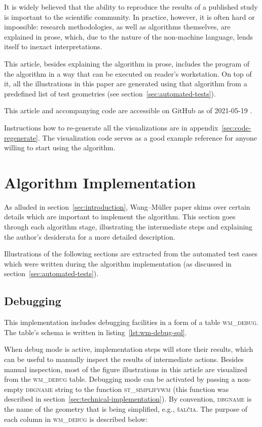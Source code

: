 \documentclass[a4paper]{article}
\newcommand{\WM}{Wang--M{\"u}ller}
\begin{document}
It is widely believed that the ability to reproduce the results of a published
study is important to the scientific community. In practice, however, it is
often hard or impossible: research methodologies, as well as algorithms
themselves, are explained in prose, which, due to the nature of the non-machine
language, lends itself to inexact interpretations.

This article, besides explaining the algorithm in prose, includes the program
of the algorithm in a way that can be executed on reader's workstation. On top
of it, all the illustrations in this paper are generated using that algorithm
from a predefined list of test geometries (see
section~\ref{sec:automated-tests}).

This article and accompanying code are accessible on GitHub as of 2021-05-19
\cite{wmsql}.

Instructions how to re-generate all the visualizations are in
appendix~\ref{sec:code-regenerate}. The visualization code serves as a good
example reference for anyone willing to start using the algorithm.

\section{Algorithm Implementation}

As alluded in section~\ref{sec:introduction}, {\WM} paper skims over
certain details which are important to implement the algorithm. This section
goes through each algorithm stage, illustrating the intermediate steps and
explaining the author's desiderata for a more detailed description.

Illustrations of the following sections are extracted from the automated test
cases which were written during the algorithm implementation (as discussed in
section~\ref{sec:automated-tests}).

\subsection{Debugging}
\label{sec:debugging}

This implementation includes debugging facilities in a form of a table
\textsc{wm\_debug}. The table's schema is written in
listing~\ref{lst:wm-debug-sql}.

When debug mode is active, implementation steps will store their results, which
can be useful to manually inspect the results of intermediate actions. Besides
manual inspection, most of the figure illustrations in this article are
visualized from the \textsc{wm\_debug} table. Debugging mode can be activated
by passing a non-empty \textsc{dbgname} string to the function
\textsc{st\_simplifywm} (this function was described in
section~\ref{sec:technical-implementation}). By convention, \textsc{dbgname} is
the name of the geometry that is being simplified, e.g., \textsc{šalčia}. The
purpose of each column in \textsc{wm\_debug} is described below:
\end{document}
